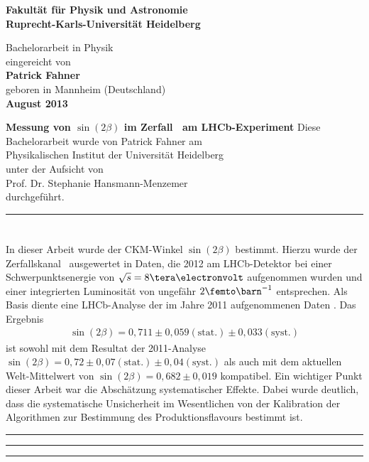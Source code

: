 \begin{titlepage}
\thispagestyle{empty}
\begin{center}
 
\Large\textbf{Fakultät für Physik und Astronomie\\
Ruprecht-Karls-Universität Heidelberg}

\vfill
\normalsize
Bachelorarbeit in Physik\\
eingereicht von\\
\vspace{0.5cm}
\Large\textbf{Patrick Fahner}\\
\normalsize
\vspace{0.5cm}
geboren in Mannheim (Deutschland)\\
\vspace{0.5cm}
\Large\textbf{August 2013}

\newpage
\thispagestyle{empty}
\cleardoublepage
\thispagestyle{empty}
\normalsize
\boldmath
\Huge{\textbf{Messung von $\sin(2\beta)$ im Zerfall \Decaychannel\ am LHCb-Experiment}}
\unboldmath
\vfill
\normalsize
Diese Bachelorarbeit wurde von Patrick Fahner am\\
Physikalischen Institut der Universität Heidelberg\\
unter der Aufsicht von\\
Prof. Dr. Stephanie Hansmann-Menzemer \\
durchgeführt.
\end{center}
\end{titlepage}
\newpage
\hrule
\section*{\abstractname}
In dieser Arbeit wurde der CKM-Winkel $\sin(2\beta)$ bestimmt. Hierzu wurde der Zerfallskanal \Decaychannel\ ausgewertet in Daten, die 2012 am LHCb-Detektor bei einer Schwerpunktsenergie von $\sqrt{s}=8\tera\electronvolt$ aufgenommen wurden und einer integrierten Luminosität von ungefähr $2\femto\barn^{-1}$ entsprechen. Als Basis diente eine LHCb-Analyse der im Jahre 2011 aufgenommenen Daten \cite{lhcb-paper}. Das Ergebnis 
\begin{align*}
\sin(2\beta) = 0,711 \pm 0,059(\text{stat.}) \pm 0,033(\text{syst.})
\end{align*}
ist sowohl mit dem Resultat der 2011-Analyse $\sin(2\beta) = 0,72 \pm 0,07 (\text{stat.}) \pm 0,04 (\text{syst.})$ \cite{lhcb-paper} als auch mit dem aktuellen Welt-Mittelwert von $\sin(2\beta) = 0,682 \pm 0,019$ \cite{pdg-average} kompatibel. Ein wichtiger Punkt dieser Arbeit war die Abschätzung systematischer Effekte. Dabei wurde deutlich, dass die systematische Unsicherheit im Wesentlichen von der Kalibration der Algorithmen zur Bestimmung des Produktionsflavours bestimmt ist. \\
\hrule
\vfill
\hrule
{}
\hrule
